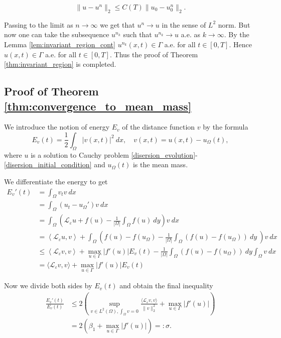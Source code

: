 \documentclass[12pt, a4paper]{article}
\theoremstyle{break}
\theoremstyle{break}
\theoremstyle{break}
\theoremstyle{break}
\theoremstyle{break}
\newcommand{\Leo}{\mathcal{L}_{\varepsilon}}
\begin{document}
\begin{equation*}
    \|u - u^n\|_2 \leq C(T)\|u_0 - u_0^n\|_2.
\end{equation*}

Passing to the limit as $n \rightarrow \infty$ we get that $u^n \rightarrow u$ in the sense of $L^2$ norm. But now one can take the subsequence $u^{n_k}$ such that $u^{n_k} \rightarrow u$ a.e. as $k \rightarrow \infty$. By the Lemma \ref{lem:invariant_region_cont} $u^{n_k}(x,t) \in \Gamma$ a.e. for all $t \in [0, T]$. Hence $u(x,t) \in \Gamma$ a.e. for all $t \in [0, T]$. Thus the proof of Theorem \ref{thm:invariant_region} is completed.

\subsection{Proof of Theorem \ref{thm:convergence_to_mean_mass}}

We introduce the notion of energy $E_v$ of the distance function $v$ by the formula
\begin{equation*}
    E_v(t) = \frac{1}{2}\int_\Omega |v(x,t)|^2 \:dx, \quad v(x,t) = u(x,t) - u_\Omega(t),
\end{equation*}
where $u$ is a solution to Cauchy problem \eqref{disersion_evolution}-\eqref{disersion_initial_condition} and $u_\Omega(t)$ is the mean mass.

We differentiate the energy to get
\begin{align*}
    E_v'(t) &= \int_\Omega v_tv \:dx \\
    &= \int_\Omega \left(u_t - u_\Omega'\right)v\:dx \\
    &= \int_\Omega \left(\Leo u + f(u) - \frac{1}{|\Omega|} \int_\Omega f(u)\:dy\right)v\:dx \\
    &= \left\langle \Leo u, v\right\rangle + \int_\Omega \left( f(u) - f(u_\Omega) - \frac{1}{|\Omega|} \int_\Omega \left(f(u) - f(u_\Omega)\right)\:dy\:\right) v \: dx \\
    &\leq \left\langle \Leo v, v\right\rangle + \max_{u \in \Gamma}|f'(u)| E_v(t) - \frac{1}{|\Omega|} \int_\Omega \left(f(u) - f(u_\Omega)\right)\:dy \int_\Omega v\:dx\\
    &= \langle \Leo v, v\rangle + \max_{u \in \Gamma}|f'(u)| E_v(t)
\end{align*}

Now we divide both sides by $E_v(t)$ and obtain the final inequality
\begin{align*}
    \frac{E_v'(t)}{E_v(t)} &\leq 2\left(\sup_{v \in L^2(\Omega), \int_\Omega v = 0}\frac{\langle \Leo v, v \rangle}{\|v\|_2^2} + \max_{u \in \Gamma}|f'(u)|\right) \\
    &= 2\left(\beta_1 + \max_{u \in \Gamma}|f'(u)|\right) =: \sigma.
\end{align*}
\end{document}
